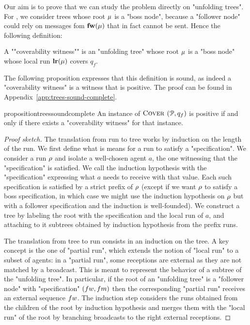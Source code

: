 Our aim is to prove that we can study the \COVER problem directly on "unfolding trees". For \COVER, we consider trees whose root $\mu$ is a "boss node", because a "follower node" could rely on messages fom $\mathbf{fw}(\mu)$ that in fact cannot be sent. 
Hence the following definition: 

\begin{definition}
\label{def:cov_witness}
A ""coverability witness"" is an "unfolding tree" whose root $\mu$ is a "boss node" whose local run $\mathbf{lr}(\mu)$ covers $q_f$. 
\end{definition}

The following proposition expresses that this definition is sound, as indeed a "coverability witness" is a witness that \COVER is positive.
The proof can be found in Appendix~\ref{app:trees-sound-complete}.


\begin{restatable}{proposition}{treessoundcomplete}
\label{prop:trees-sound-complete}
An instance of $\textsc{Cover}$ $(\mathcal{P},q_f)$ is positive if and only if there exists a "coverability witness" for that instance.
\end{restatable}

\begin{proof}[Proof sketch]
The translation from run to tree works by induction on the length of the run. We first define what is means for a run to satisfy a "specification". We consider a run $\rho$ and isolate a well-chosen agent $a$, the one witnessing that the "specification" is satisfied. We call the induction hypothesis with the "specification" expressing what $a$ needs to receive with that value. Each such specification is satisfied by a strict prefix of $\rho$ (except if we want $\rho$ to satisfy a boss specification, in which case we might use the induction hypothesis on $\rho$ but with a follower specification and the induction is well-founded).
We construct a tree by labeling the root with the specification and the local run of $a$, and attaching to it subtrees obtained by induction hypothesis from the prefix runs.

The translation from tree to run consists in an induction on the tree. A key concept is the one of "partial run", which extends the notion of "local run" to a subset of agents: in a "partial run", some receptions are external as they are not matched by a broadcast. This is meant to represent the behavior of a subtree of the "unfolding tree". In particular, if the root of an "unfolding tree" is a "follower node" with "specification" $(\followwordspec, \followmessagespec)$ then the corresponding "partial run" receives an external sequence $\followwordspec$. The induction step  considers the runs obtained from the children of the root by induction hypothesis and merges them with the "local run" of the root by branching broadcasts to the right external receptions. 
\end{proof}



